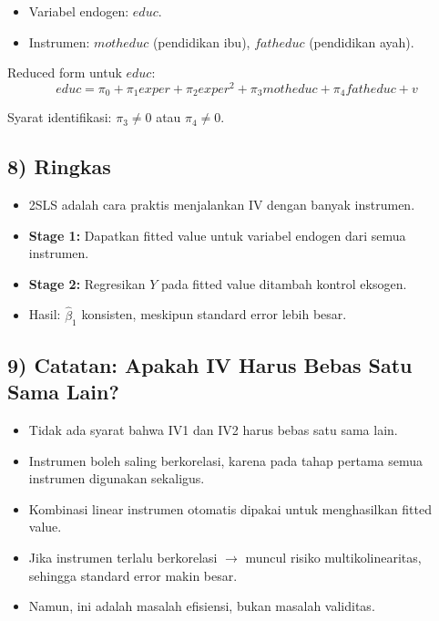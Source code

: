 \documentclass[]{article}
\begin{document}
\begin{itemize}
    \item Variabel endogen: $educ$.
    \item Instrumen: $motheduc$ (pendidikan ibu), $fatheduc$ (pendidikan ayah).
\end{itemize}

Reduced form untuk $educ$:
\[
educ = \pi_0 + \pi_1 exper + \pi_2 exper^2 + \pi_3 motheduc + \pi_4 fatheduc + v
\]

\noindent
Syarat identifikasi: $\pi_3 \neq 0$ atau $\pi_4 \neq 0$.

\subsection*{8) Ringkas}
\begin{itemize}
    \item 2SLS adalah cara praktis menjalankan IV dengan banyak instrumen.
    \item \textbf{Stage 1:} Dapatkan fitted value untuk variabel endogen dari semua instrumen.
    \item \textbf{Stage 2:} Regresikan $Y$ pada fitted value ditambah kontrol eksogen.
    \item Hasil: $\hat{\beta}_1$ konsisten, meskipun standard error lebih besar.
\end{itemize}

\subsection*{9) Catatan: Apakah IV Harus Bebas Satu Sama Lain?}
\begin{itemize}
    \item Tidak ada syarat bahwa IV1 dan IV2 harus bebas satu sama lain.
    \item Instrumen boleh saling berkorelasi, karena pada tahap pertama semua instrumen digunakan sekaligus.
    \item Kombinasi linear instrumen otomatis dipakai untuk menghasilkan fitted value.
    \item Jika instrumen terlalu berkorelasi $\rightarrow$ muncul risiko multikolinearitas, sehingga standard error makin besar.
    \item Namun, ini adalah masalah efisiensi, bukan masalah validitas.
\end{itemize}
\end{document}
